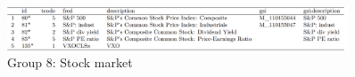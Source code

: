 \begin{figure}
        \centering
        \caption*{Group 8: Stock market}
        \includegraphics[width=0.9\textwidth]{figures/G8.png}
\end{figure}













